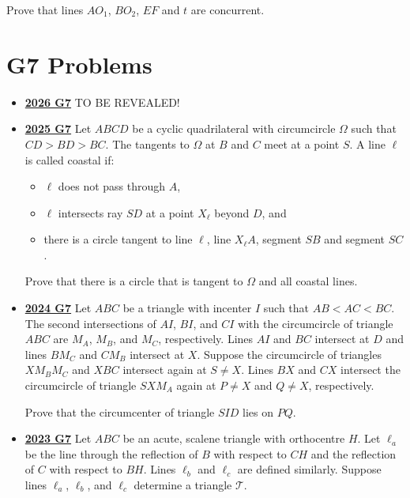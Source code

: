 \documentclass[11pt]{scrartcl}
\begin{document}
\begin{itemize}[leftmargin=*]
Prove that lines $ AO_{1}$, $ BO_{2}$, $ EF$ and $ t$ are concurrent.
\end{itemize}
\newpage
\section*{G7 Problems}  \label{G7}
\begin{itemize}[leftmargin=*]


\item \href{https://www.imo-official.org/assets/documents/problems/2026/IMO2026SL.pdf}{\textbf{2026 G7}} TO BE REVEALED!

\item \href{https://artofproblemsolving.com/community/c6h3866846p38676930}{\textbf{2025 G7}} Let $ABCD$ be a cyclic quadrilateral with circumcircle $\Omega$ such that $CD > BD > BC$. The tangents to $\Omega$ at $B$ and $C$ meet at a point $S$. A line $\ell$ is called coastal if:
\begin{itemize}[leftmargin=*]
\item[$\bullet$] $\ell$ does not pass through $A$,
\item[$\bullet$] $\ell$ intersects ray $SD$ at a point $X_\ell$ beyond $D$, and
\item[$\bullet$] there is a circle tangent to line $\ell$, line $X_\ell A$, segment $SB$ and segment $SC$.
\end{itemize}
Prove that there is a circle that is tangent to $\Omega$ and all coastal lines. 


\item \href{https://artofproblemsolving.com/community/c6h3610452p35340925}{\textbf{2024 G7}} Let \(ABC\) be a triangle with incenter \(I\) such that \(AB<AC<BC\). The second intersections of \(AI\), \(BI\), and \(CI\) with the circumcircle of triangle \(ABC\) are \(M_{A}\), \(M_{B}\), and \(M_{C}\), respectively. Lines \(AI\) and \(BC\) intersect at \(D\) and lines \(BM_{C}\) and \(CM_{B}\) intersect at \(X\). Suppose the circumcircle of triangles \(XM_{B}M_{C}\) and \(XBC\) intersect again at \(S\neq X\). Lines \(BX\) and \(CX\) intersect the circumcircle of triangle \(SXM_{A}\) again at \(P\neq X\) and \(Q\neq X\), respectively.

Prove that the circumcenter of triangle \(SID\) lies on \(PQ\).
\item \href{https://artofproblemsolving.com/community/c6h3359736p31218400}{\textbf{2023 G7}} Let $ABC$ be an acute, scalene triangle with orthocentre $H$. Let $\ell_a$ be the line through the reflection of $B$ with respect to $CH$ and the reflection of $C$ with respect to $BH$. Lines $\ell_b$ and $\ell_c$ are defined similarly. Suppose lines $\ell_a$, $\ell_b$, and $\ell_c$ determine a triangle $\mathcal T$.


\end{itemize}
\end{document}
